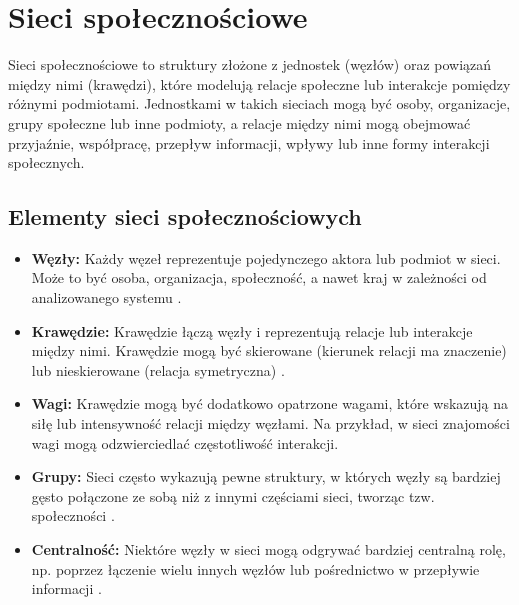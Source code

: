 \section{Sieci społecznościowe}
Sieci społecznościowe to struktury złożone z jednostek (węzłów) oraz powiązań między nimi (krawędzi), które modelują relacje społeczne lub interakcje pomiędzy różnymi podmiotami.
Jednostkami w takich sieciach mogą być osoby, organizacje, grupy społeczne lub inne podmioty,
a relacje między nimi mogą obejmować przyjaźnie, współpracę, przepływ informacji, wpływy lub inne formy interakcji społecznych.

\subsection{Elementy sieci społecznościowych}
\begin{itemize}
    \item \textbf{Węzły:} Każdy węzeł reprezentuje pojedynczego aktora lub podmiot w sieci.
          Może to być osoba, organizacja, społeczność, a nawet kraj w zależności od analizowanego systemu \cite{Wasserman1994}.
    \item \textbf{Krawędzie:} Krawędzie łączą węzły i reprezentują relacje lub interakcje między nimi.
          Krawędzie mogą być skierowane (kierunek relacji ma znaczenie) lub nieskierowane (relacja symetryczna) \cite{Newman2010}.
    \item \textbf{Wagi:} Krawędzie mogą być dodatkowo opatrzone wagami, które wskazują na siłę lub intensywność relacji między węzłami.
          Na przykład, w sieci znajomości wagi mogą odzwierciedlać częstotliwość interakcji.
    \item \textbf{Grupy:} Sieci często wykazują pewne struktury, w których węzły są bardziej gęsto połączone ze sobą niż z innymi częściami sieci, tworząc tzw. społeczności \cite{Girvan2002}.
    \item \textbf{Centralność:} Niektóre węzły w sieci mogą odgrywać bardziej centralną rolę, np. poprzez łączenie wielu innych węzłów lub pośrednictwo w przepływie informacji \cite{Freeman1979}.
\end{itemize}

